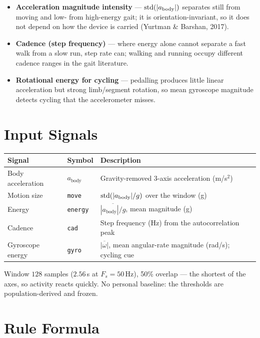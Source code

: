 \begin{itemize}[leftmargin=1.4em]
  \item \textbf{Acceleration magnitude intensity} --- $\operatorname{std}(|a_\text{body}|)$ separates
  still from moving and low- from high-energy gait; it is orientation-invariant, so it does
  not depend on how the device is carried (Yurtman \& Barshan, 2017).
  \item \textbf{Cadence (step frequency)} --- where energy alone cannot separate a fast walk
  from a slow run, step rate can; walking and running occupy different cadence ranges in the
  gait literature.
  \item \textbf{Rotational energy for cycling} --- pedalling produces little linear
  acceleration but strong limb/segment rotation, so mean gyroscope magnitude detects cycling
  that the accelerometer misses.
\end{itemize}

\section{Input Signals}

\begin{center}
\begin{tabular}{@{}l l >{\raggedright\arraybackslash}p{7.2cm}@{}}
\toprule
\textbf{Signal} & \textbf{Symbol} & \textbf{Description} \\
\midrule
Body acceleration     & $a_\text{body}$ & Gravity-removed 3-axis acceleration (m/s$^2$) \\
Motion size           & \texttt{move}   & $\operatorname{std}(|a_\text{body}|/g)$ over the window (g) \\
Energy                & \texttt{energy} & $\overline{|a_\text{body}|/g}$, mean magnitude (g) \\
Cadence               & \texttt{cad}    & Step frequency (Hz) from the autocorrelation peak \\
Gyroscope energy      & \texttt{gyro}   & $\overline{|\omega|}$, mean angular-rate magnitude (rad/s); cycling cue \\
\bottomrule
\end{tabular}
\end{center}

\noindent Window $128$ samples ($2.56$\,s at $F_s = 50$\,Hz), 50\% overlap --- the shortest
of the axes, so activity reacts quickly. No personal baseline: the thresholds are
population-derived and frozen.

\section{Rule Formula}

